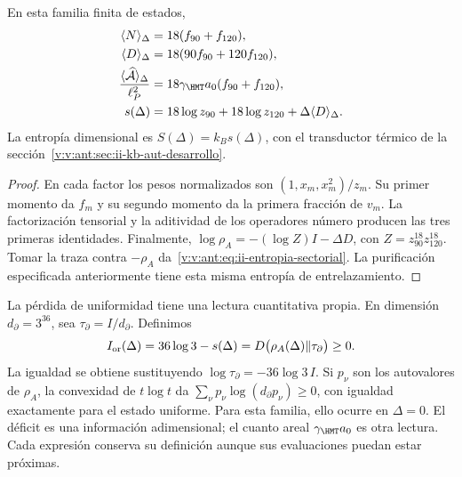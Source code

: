 \begin{proposition}
En esta familia finita de estados,
\begin{align}
 \langle N\rangle_\Delta&=18(f_{90}+f_{120}),\\
 \langle D\rangle_\Delta&=18(90f_{90}+120f_{120}),\\
 \frac{\langle\widehat{\mathcal A}\rangle_\Delta}{\ell_P^2}
 &=18\gamma_{\HMT}a_0(f_{90}+f_{120}),
 \label{v:v:ant:eq:ii-area-media}\\
 s(\Delta)&=18\log z_{90}+18\log z_{120}
                  +\Delta\langle D\rangle_\Delta.
 \label{v:v:ant:eq:ii-entropia-sectorial}
\end{align}
La entropía dimensional es $S(\Delta)=k_Bs(\Delta)$, con el
transductor térmico de la sección~\ref{v:v:ant:sec:ii-kb-aut-desarrollo}.
\end{proposition}
\begin{proof}
En cada factor los pesos normalizados son
$(1,x_m,x_m^2)/z_m$. Su primer momento da $f_m$ y su segundo
momento da la primera fracción de $v_m$. La factorización tensorial
y la aditividad de los operadores número producen las tres primeras
identidades. Finalmente,
$\log\rho_A=-(\log Z)I-\Delta D$, con
$Z=z_{90}^{18}z_{120}^{18}$. Tomar la traza contra $-\rho_A$
da~\eqref{v:v:ant:eq:ii-entropia-sectorial}. La purificación especificada
anteriormente tiene esta misma entropía de entrelazamiento.
\end{proof}

La pérdida de uniformidad tiene una lectura cuantitativa propia.
En dimensión \(d_\partial=3^{36}\), sea
\(\tau_\partial=I/d_\partial\). Definimos
\begin{equation}
 I_{\rm or}(\Delta)=36\log3-s(\Delta)
 =D\bigl(\rho_A(\Delta)\Vert\tau_\partial\bigr)\ge0.
 \label{v:v:ant:eq:ii-area-deficit-informacional}
\end{equation}
La igualdad se obtiene sustituyendo
\(\log\tau_\partial=-36\log3\,I\). Si \(p_\nu\) son los
autovalores de \(\rho_A\), la convexidad de \(t\log t\) da
\(\sum_\nu p_\nu\log(d_\partial p_\nu)\ge0\), con igualdad
exactamente para el estado uniforme. Para esta familia, ello ocurre en
\(\Delta=0\). El déficit es una información adimensional; el cuanto
areal \(\gamma_{\HMT}a_0\) es otra lectura. Cada expresión conserva
su definición aunque sus evaluaciones puedan estar próximas.

